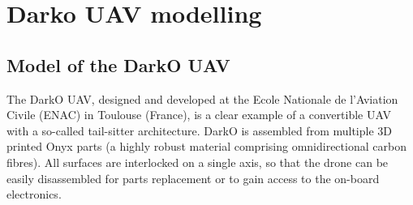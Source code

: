 \chapter{Darko UAV modelling}

\section{Model of the DarkO UAV}
\label{sec:model}
The DarkO UAV, designed and developed at the Ecole Nationale de l'Aviation Civile (ENAC) in Toulouse
 (France), is a clear example of a convertible UAV with a so-called tail-sitter architecture. 
 DarkO is assembled from multiple 3D printed Onyx parts (a highly robust material comprising 
 omnidirectional carbon fibres). All surfaces are interlocked on a single axis, so that the drone 
 can be easily disassembled for parts replacement or to gain access to the on-board electronics. 

